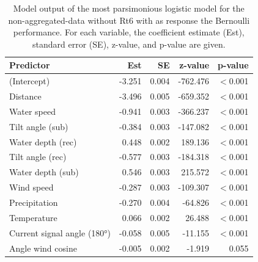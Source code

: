 \documentclass[doublespacing,linenumbers]{bmcart}
\begin{document}
\begin{backmatter}
\begin{table}[]
\centering
\caption{Model output of the most parsimonious logistic model for the non-aggregated-data without Rt6 with as response the Bernoulli performance. For each variable, the coefficient estimate (Est), standard error (SE), z-value, and p-value are given.}
\begin{tabular}{lrrrr}
\hline
Predictor                                        & Est    & SE    & z-value      & p-value \\ \hline
(Intercept)                                      & -3.251                  & 0.004                  & -762.476                    & $<$0.001 \\
Distance                                         & -3.496                  & 0.005                  & -659.352                    & $<$0.001 \\
Water speed                                      & -0.941                  & 0.003                  & -366.237                    & $<$0.001 \\
Tilt angle (sub)                                 & -0.384                  & 0.003                  & -147.082                    & $<$0.001 \\
Water depth (rec)                                & 0.448                   & 0.002                  & 189.136                     & $<$0.001 \\
Tilt angle (rec)                                 & -0.577                  & 0.003                  & -184.318                    & $<$0.001 \\
Water depth (sub)                                & 0.546                   & 0.003                  & 215.572                     & $<$0.001 \\
Wind speed                                       & -0.287                  & 0.003                  & -109.307                    & $<$0.001 \\
Precipitation                                    & -0.270                   & 0.004                  & -64.826                     & $<$0.001 \\
Temperature                                         & 0.066                   & 0.002                  & 26.488                      & $<$0.001 \\
Current signal angle (180°)                      & -0.058                  & 0.005                  & -11.155                     & $<$0.001 \\
Angle wind cosine                                & -0.005                  & 0.002                  & -1.919                      & 0.055    \\

\end{tabular}
\end{table}
\end{backmatter}
\end{document}
